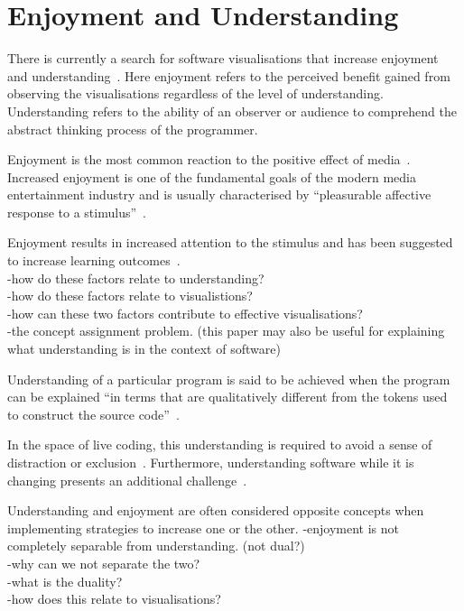 \section{Enjoyment and Understanding}

There is currently a search for software visualisations that increase enjoyment and understanding~\cite{McLean2010a}. Here enjoyment refers to the perceived benefit gained from observing the visualisations regardless of the level of understanding. Understanding refers to the ability of an observer or audience to comprehend the abstract thinking process of the programmer.

Enjoyment is the most common reaction to the positive effect of media~\cite{Vorderer2004}. Increased enjoyment is one of the fundamental goals of the modern media entertainment industry and is usually characterised by ``pleasurable affective response to a stimulus''~\cite{Brock2004}. 

Enjoyment results in increased attention to the stimulus and has been suggested to increase learning outcomes~.\\
-how do these factors relate to understanding?\\
-how do these factors relate to visualistions?\\
-how can these two factors contribute to effective visualisations?\\
-the concept assignment problem. \cite{Biggerstaff1994} (this paper may also be useful for explaining what understanding is in the context of software)

Understanding of a particular program is said to be achieved when the program can be explained ``in terms that are qualitatively different from the tokens used to construct the source code''~\cite{Biggerstaff1994}. 

In the space of live coding, this understanding is required to avoid a sense of distraction or exclusion~\cite{McLean2010a}. Furthermore, understanding software while it is changing presents an additional challenge~\cite{Eisenbarth2003}.

Understanding and enjoyment are often considered opposite concepts when implementing strategies to increase one or the other. 
-enjoyment is not completely separable from understanding. (not dual?)\\
-why can we not separate the two?\\
-what is the duality?\\
-how does this relate to visualisations?

